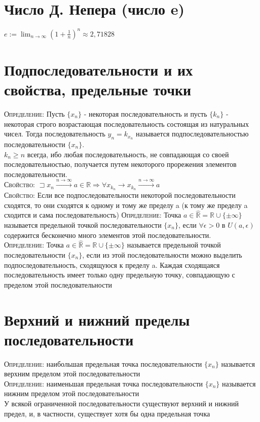 \documentclass[14pt]{article}
\begin{document}
    \section{Число Д. Непера (число e)}
        $e:=\lim_{n\rightarrow \infty} (1 + \frac{1}{n})^n \approx 2,71828$

    \section{Подпоследовательности и их свойства, предельные точки}
        \textsc{Определение:} Пусть $\{x_n\}$ - некоторая последовательность и пусть $\{k_n\}$ - некоторая строго возрастающая последовательность состоящая из натуральных чисел. Тогда последовательность $y_n = k_{x_n}$ называется подпоследовательностью последовательности $\{x_n\}$. \\
        $k_n \geqslant n$ всегда, ибо любая последовательность, не совпадающая со своей последовательностью, получается путем некоторого прорежения элементов последовательности.  \\
        \textsc{Свойство:} $\sqsupset  x_n \xrightarrow{n \rightarrow \infty} a \in \mathbb{R} \Rightarrow \forall x_{k_n} \rightarrow x_{k_n} \xrightarrow{n \rightarrow \infty} a$ \\
        \textsc{Свойство:} Если все подпоследовательности некоторой последовательности сходятся, то они сходятся к одному и тому же пределу a (к тому же пределу a сходится и сама последовательность)
        \textsc{Определение:} Точка $a \in \widehat{\mathbb{R}} = \mathbb{R} \cup \{\pm \infty \}$ называется предельной точкой последовательности $\{x_n\}$, если $\forall \epsilon > 0 $ в $ U(a, \epsilon)$ содержится бесконечно много элементов этой последовательности. \\ 
        \textsc{Определение:} Точка $a \in \widehat{\mathbb{R}} = \mathbb{R} \cup \{\pm \infty \}$ называется предельной точкой последовательности $\{x_n\}$, если из этой последовательности можно выделить подпоследовательность, сходящуюся к пределу a.
        Каждая сходящаяся последовательность имеет только одну предельную точку, совпадающую с пределом этой последовательности

    \section{Верхний и нижний пределы последовательности}
        \textsc{Определение:} наибольшая предельная точка последовательности $\{x_n\}$ называется верхним пределом этой последовательности \\
        \textsc{Определение:} наименьшая предельная точка последовательности $\{x_n\}$ называется нижним пределом этой последовательности \\
        У всякой ограниченной последовательности существуют верхний и нижний предел, и, в частности, существует хотя бы одна предельная точка
\end{document}
